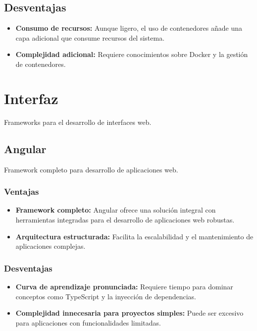 \subsection{Desventajas}
\begin{itemize}
    \item \textbf{Consumo de recursos:} Aunque ligero, el uso de contenedores añade una capa adicional que consume recursos del sistema.
    
    \item \textbf{Complejidad adicional:} Requiere conocimientos sobre Docker y la gestión de contenedores.
\end{itemize}

\clearpage
\section{Interfaz}
Frameworks para el desarrollo de interfaces web.

\subsection{Angular}
Framework completo para desarrollo de aplicaciones web.

\subsubsection{Ventajas}
\begin{itemize}
    \item \textbf{Framework completo:} Angular ofrece una solución integral con herramientas integradas para el desarrollo de aplicaciones web robustas.
    
    \item \textbf{Arquitectura estructurada:} Facilita la escalabilidad y el mantenimiento de aplicaciones complejas.
\end{itemize}

\subsubsection{Desventajas}
\begin{itemize}
    \item \textbf{Curva de aprendizaje pronunciada:} Requiere tiempo para dominar conceptos como TypeScript y la inyección de dependencias.
    
    \item \textbf{Complejidad innecesaria para proyectos simples:} Puede ser excesivo para aplicaciones con funcionalidades limitadas.
\end{itemize}

